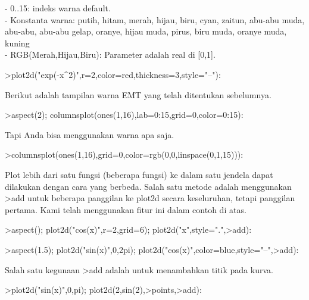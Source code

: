 \documentclass[a4paper,10pt]{article}
\begin{document}
\begin{eulernotebook}
\begin{eulercomment}
\begin{eulercomment}
\begin{eulercomment}
\begin{eulercomment}
\begin{eulercomment}
\begin{eulercomment}
\begin{eulercomment}
\begin{eulercomment}
\begin{eulercomment}
\begin{eulercomment}
\begin{eulercomment}
\begin{eulercomment}
\begin{eulercomment}
\begin{eulercomment}
\begin{eulercomment}
- 0..15: indeks warna default.\\
- Konstanta warna: putih, hitam, merah, hijau, biru, cyan, zaitun,
abu-abu muda, abu-abu, abu-abu gelap, oranye, hijau muda, pirus, biru
muda, oranye muda, kuning\\
- RGB(Merah,Hijau,Biru): Parameter adalah real di [0,1].
\end{eulercomment}
\begin{eulerprompt}
>plot2d("exp(-x^2)",r=2,color=red,thickness=3,style="--"):
\end{eulerprompt}
\begin{eulercomment}
Berikut adalah tampilan warna EMT yang telah ditentukan sebelumnya.
\end{eulercomment}
\begin{eulerprompt}
>aspect(2); columnsplot(ones(1,16),lab=0:15,grid=0,color=0:15):
\end{eulerprompt}
\begin{eulercomment}
Tapi Anda bisa menggunakan warna apa saja.
\end{eulercomment}
\begin{eulerprompt}
>columnsplot(ones(1,16),grid=0,color=rgb(0,0,linspace(0,1,15))):
\end{eulerprompt}
\begin{eulercomment}
Plot lebih dari satu fungsi (beberapa fungsi) ke dalam satu jendela
dapat dilakukan dengan cara yang berbeda. Salah satu metode adalah
menggunakan \textgreater{}add untuk beberapa panggilan ke plot2d secara
keseluruhan, tetapi panggilan pertama. Kami telah menggunakan fitur
ini dalam contoh di atas.
\end{eulercomment}
\begin{eulerprompt}
>aspect(); plot2d("cos(x)",r=2,grid=6); plot2d("x",style=".",>add):
\end{eulerprompt}
\begin{eulerprompt}
>aspect(1.5); plot2d("sin(x)",0,2pi); plot2d("cos(x)",color=blue,style="--",>add):
\end{eulerprompt}
\begin{eulercomment}
Salah satu kegunaan \textgreater{}add adalah untuk menambahkan titik pada kurva.
\end{eulercomment}
\begin{eulerprompt}
>plot2d("sin(x)",0,pi); plot2d(2,sin(2),>points,>add):

\end{eulerprompt}
\end{eulercomment}
\end{eulercomment}
\end{eulercomment}
\end{eulercomment}
\end{eulercomment}
\end{eulercomment}
\end{eulercomment}
\end{eulercomment}
\end{eulercomment}
\end{eulercomment}
\end{eulercomment}
\end{eulercomment}
\end{eulercomment}
\end{eulercomment}
\end{eulernotebook}
\end{document}
